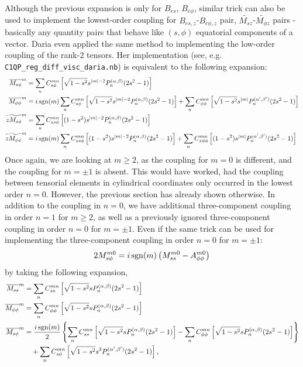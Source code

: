 Although the previous expansion is only for $B_{es}$, $B_{e\phi}$, similar trick can also be used to implement the lowest-order coupling for $B_{es, z}$-$B_{e\phi,z}$ pair, $\widetilde{M_{sz}}$-$\widetilde{M_{\phi z}}$ pairs - basically any quantity pairs that behave like $(s,\phi)$ equatorial components of a vector. 
Daria even applied the same method to implementing the low-order coupling of the rank-$2$ tensors. 
Her implementation (see, e.g. \texttt{C1QP\_reg\_diff\_visc\_daria.nb}) is equivalent to the following expansion:
\[\begin{aligned}
    \overline{M_{s\phi}}^m &= \sum_n C_{s\phi}^{mn} \left[\sqrt{1-s^2}s^{|m|-2}P_n^{(\alpha, \beta)}(2s^2-1)\right] \\ 
    \overline{M_{\phi\phi}}^m &= i\operatorname{sgn}(m)\sum_n C_{s\phi}^{mn} \left[\sqrt{1-s^2}s^{|m|-2}P_n^{(\alpha, \beta)}(2s^2-1)\right] + \sum_n C_{\phi\phi}^{mn} \left[\sqrt{1-s^2}s^{|m|}P_n^{(\alpha', \beta')}(2s^2-1)\right] \\ 
    \widetilde{zM_{s\phi}}^m &= \sum_n C_{zs\phi}^{mn} \left[(1-s^2) s^{|m|-2}P_n^{(\alpha, \beta)}(2s^2-1)\right] \\ 
    \widetilde{zM_{\phi\phi}}^m &= i\operatorname{sgn}(m)\sum_n C_{zs\phi}^{mn} \left[(1-s^2)s^{|m|-2}P_n^{(\alpha, \beta)}(2s^2-1)\right] + \sum_n C_{z\phi\phi}^{mn} \left[{(1-s^2)}s^{|m|}P_n^{(\alpha', \beta')}(2s^2-1)\right]
\end{aligned}\]
Once again, we are looking at $m\geq 2$, as the coupling for $m=0$ is different, and the coupling for $m=\pm 1$ is absent.
This would have worked, had the coupling between tensorial elements in cylindrical coordinates only occurred in the lowest order $n=0$.
However, the previous section has already shown otherwise. In addition to the coupling in $n=0$, we have additional three-component coupling in order $n=1$ for $m\geq 2$, as well as a previously ignored three-component coupling in order $n=0$ for $m=\pm 1$.
Even if the same trick can be used for implementing the three-component coupling in order $n=0$ for $m=\pm 1$:
\[
    2M_{s\phi}^{m0} = i\operatorname{sgn}(m) \left(M_{ss}^{m0} - A_{\phi\phi}^{m0}\right)
\]
by taking the following expansion,
\[\begin{aligned}
    \overline{M_{ss}}^m &= \sum_n C_{ss}^{mn} \left[\sqrt{1-s^2}s P_n^{(\alpha, \beta)}(2s^2-1)\right] \\
    \overline{M_{\phi\phi}}^m &= \sum_n C_{\phi\phi}^{mn} \left[\sqrt{1-s^2}s P_n^{(\alpha, \beta)}(2s^2-1)\right] \\
    \overline{M_{s\phi}}^m &= \frac{i\operatorname{sgn}(m)}{2} \left\{\sum_n C_{ss}^{mn} \left[\sqrt{1-s^2}s P_n^{(\alpha, \beta)}(2s^2-1)\right] - \sum_n C_{\phi\phi}^{mn} \left[\sqrt{1-s^2}s P_n^{(\alpha, \beta)}(2s^2-1)\right]\right\} \\ 
    &\quad + \sum_n C_{s\phi}^{mn} \left[\sqrt{1 - s^2} s^3 P_n^{(\alpha', \beta')}(2s^2 - 1)\right],
\end{aligned}\]
